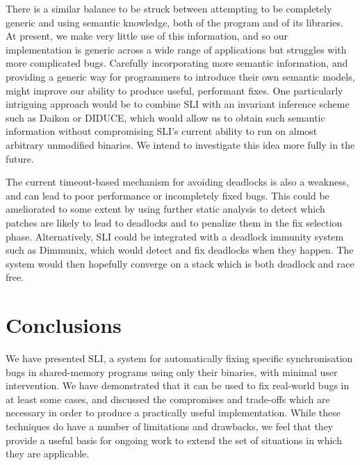 \documentclass[10pt,twocolumn,preprint,natbib,authoryear]{sigplanconf}
\newcommand{\editorial}[1]{}
\begin{document}
There is a similar balance to be struck between attempting to be
completely generic and using semantic knowledge, both of the program
and of its libraries.  At present, we make very little use of this
information, and so our implementation is generic across a wide range
of applications but struggles with more complicated bugs.  Carefully
incorporating more semantic information, and providing a generic way
for programmers to introduce their own semantic models, might improve
our ability to produce useful, performant fixes.  One particularly
intriguing approach would be to combine SLI with an invariant
inference scheme such as Daikon\cite{Ernst2007} or
DIDUCE\cite{Hangal2002}, which would allow us to obtain such semantic
information without compromising SLI's current ability to run on
almost arbitrary unmodified binaries.  We intend to investigate this
idea more fully in the future.

The current timeout-based mechanism for avoiding deadlocks is also a
weakness, and can lead to poor performance or incompletely fixed bugs.
This could be ameliorated to some extent by using further static
analysis to detect which patches are likely to lead to deadlocks and
to penalize them in the fix selection phase.  Alternatively, SLI could
be integrated with a deadlock immunity system such as
Dimmunix\cite{Jula2008}, which would detect and fix deadlocks when
they happen.  The system would then hopefully converge on a stack
which is both deadlock and race free.

\section{Conclusions}

We have presented SLI, a system for automatically fixing specific
synchronisation bugs in shared-memory programs using only their
binaries, with minimal user intervention.  We have demonstrated that
it can be used to fix real-world bugs in at least some cases, and
discussed the compromises and trade-offs which are necessary in order
to produce a practically useful implementation.  While these
techniques do have a number of limitations and drawbacks, we feel that
they provide a useful basis for ongoing work to extend the set of
situations in which they are applicable.\editorial{Wibble wibble
  wibble}




\end{document}
